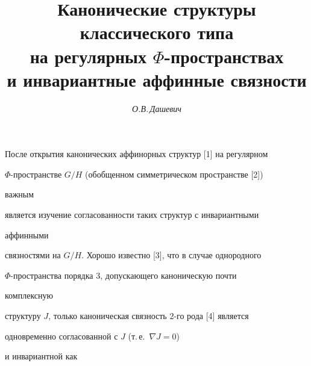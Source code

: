 

\author{\it О.В.\,Дашевич} 




\title{Канонические структуры классического типа\\ 


на регулярных $\Phi$-пространствах\\ 


и инвариантные аффинные связности} 


 


\date{} 




 


\pagestyle{plain} %


 


 




 


\maketitle 


\label{begin} 


 


 


После открытия канонических аффинорных структур [1] на регулярном 


$\Phi$-пространстве $G/H$ (обобщенном симметрическом пространстве [2]) 


важным 


является изучение согласованности таких структур с инвариантными 


аффинными 


связностями на $G/H$. Хорошо известно [3], что в случае однородного 


$\Phi$-пространства порядка 3, допускающего каноническую почти 


комплексную 


структуру $J$, только каноническая связность 2-го рода [4] является 


одновременно согласованной с $J$ (т.\,е.~$\nabla J=0$) 


и инвариантной как 


